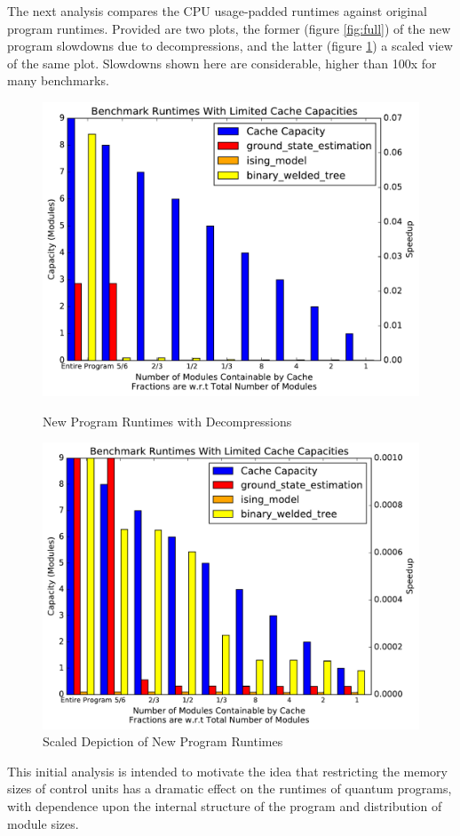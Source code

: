 	The next analysis compares the CPU usage-padded runtimes against original program runtimes. Provided are two plots, the former (figure \ref{fig:full}) of the new program slowdowns due to decompressions, and the latter (figure \ref{fig:fullfocus}) a scaled view of the same plot. Slowdowns shown here are considerable, higher than 100x for many benchmarks. \par 
\begin{figure}[h]
	\begin{minipage}{0.5\textwidth}
		\centering
		\includegraphics[width=\linewidth]{Figures/full.pdf}
		\caption{New Program Runtimes with Decompressions}
        \label{fig:full}
	\end{minipage}\hfill
	\begin{minipage}{0.45\textwidth}
		\centering
        \includegraphics[width=1.1\linewidth]{Figures/fullfocused.pdf}
		\caption{Scaled Depiction of New Program Runtimes}
        \label{fig:fullfocus}
	\end{minipage}
\end{figure}

This initial analysis is intended to motivate the idea that restricting the memory sizes of control units has a dramatic effect on the runtimes of quantum programs, with dependence upon the internal structure of the program and distribution of module sizes.
